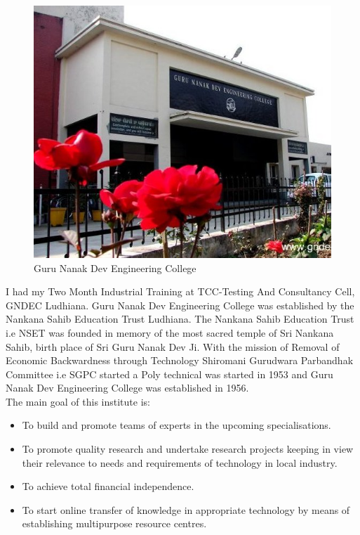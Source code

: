 \begin{figure}[ht]
\centering
\includegraphics[scale=0.5]{input/images/gndec.jpg}
\caption{Guru Nanak Dev Engineering College}
\end{figure}
\hspace{-1.7em} I had my Two Month Industrial Training at TCC-Testing And Consultancy Cell, GNDEC Ludhiana. Guru Nanak Dev Engineering College was established by the Nankana
Sahib Education Trust Ludhiana. The Nankana Sahib Education Trust i.e NSET
was founded in memory of the most sacred temple of Sri Nankana Sahib, birth place
of Sri Guru Nanak Dev Ji. With the mission of Removal of Economic Backwardness
through Technology Shiromani Gurudwara Parbandhak Committee i.e SGPC started a
Poly technical was started in 1953 and Guru Nanak Dev Engineering College was established in 1956.\\


The main goal of this institute is:
\begin{itemize}
\item To build and promote teams of experts in the upcoming specialisations.
\item To promote quality research and undertake research projects keeping in view their
relevance to needs and requirements of technology in local industry.
\item To achieve total financial independence.
\item To start online transfer of knowledge in appropriate technology by means of establishing multipurpose resource centres.
\end{itemize}
